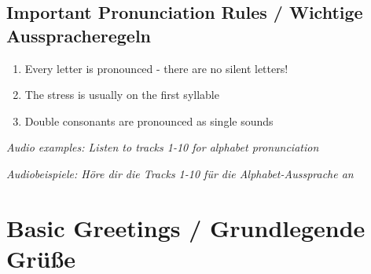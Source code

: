 \begin{grammar}
\subsection*{Important Pronunciation Rules / Wichtige Ausspracheregeln}

\begin{enumerate}
    \item Every letter is pronounced - there are no silent letters!
    \item The stress is usually on the first syllable
    \item Double consonants are pronounced as single sounds
\end{enumerate}

\textit{Audio examples: Listen to tracks 1-10 for alphabet pronunciation}

\textit{Audiobeispiele: Höre dir die Tracks 1-10 für die Alphabet-Aussprache an}
\end{grammar}

\section{Basic Greetings / Grundlegende Grüße}

